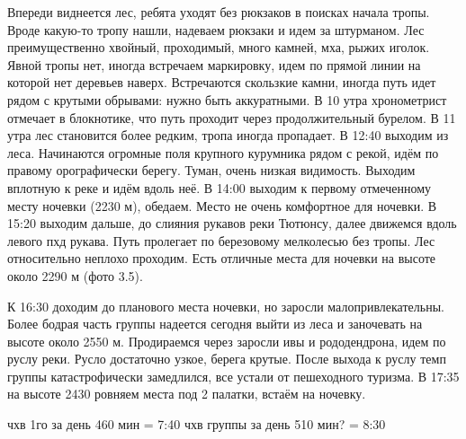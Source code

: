Впереди виднеется лес, ребята уходят без рюкзаков в поисках начала тропы. Вроде какую-то тропу нашли, надеваем рюкзаки и идем за штурманом. Лес преимущественно хвойный, проходимый, много камней, мха, рыжих иголок. Явной тропы нет, иногда встречаем маркировку, идем по прямой линии на которой нет деревьев наверх. Встречаются скользкие камни, иногда путь идет рядом с крутыми обрывами: нужно быть аккуратными. В 10 утра хронометрист отмечает в блокнотике, что путь проходит через продолжительный бурелом. В 11 утра лес становится более редким, тропа иногда пропадает. В 12:40 выходим из леса. Начинаются огромные поля крупного курумника  рядом с рекой, идём по правому орографически берегу. Туман, очень низкая видимость. Выходим вплотную к реке и идём вдоль неё. В 14:00 выходим к первому отмеченному месту ночевки (2230 м), обедаем. Место не очень комфортное для ночевки. В 15:20 выходим дальше, до слияния рукавов реки Тютюнсу, далее движемся вдоль левого пхд рукава. Путь пролегает по березовому мелколесью без тропы. Лес относительно неплохо проходим. Есть отличные места для ночевки на высоте около 2290 м (фото 3.5).

К 16:30 доходим до планового места ночевки, но заросли малопривлекательны. Более бодрая часть группы надеется сегодня выйти из леса и заночевать на высоте около 2550 м. Продираемся через заросли ивы и рододендрона, идем по руслу реки. Русло достаточно узкое, берега крутые. После выхода к руслу темп группы катастрофически замедлился, все устали от пешеходного туризма. В 17:35 на высоте 2430 ровняем места под 2 палатки, встаём на ночевку.














чхв 1го за день 460 мин = 7:40
чхв группы за день 510 мин? = 8:30


    \FloatBarrier
